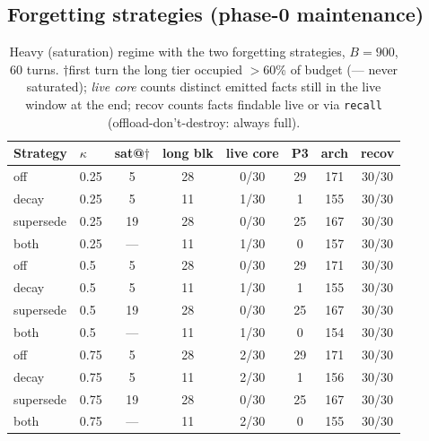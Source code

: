 \documentclass[10pt]{article}
\begin{document}
\subsection{Forgetting strategies (phase-0 maintenance)}\label{sec:forget}
\begin{table}[t]
\centering\small
\begin{tabular}{llcccccc}
\hline
Strategy & $\kappa$ & sat@$\dagger$ & long blk & live core & P3 & arch & recov\\
\hline
off       & 0.25 &  5 & 28 & 0/30 & 29 & 171 & 30/30\\
decay     & 0.25 &  5 & 11 & 1/30 &  1 & 155 & 30/30\\
supersede & 0.25 & 19 & 28 & 0/30 & 25 & 167 & 30/30\\
both      & 0.25 &  --- & 11 & 1/30 &  0 & 157 & 30/30\\
off       &  0.5 &  5 & 28 & 0/30 & 29 & 171 & 30/30\\
decay     &  0.5 &  5 & 11 & 1/30 &  1 & 155 & 30/30\\
supersede &  0.5 & 19 & 28 & 0/30 & 25 & 167 & 30/30\\
both      &  0.5 &  --- & 11 & 1/30 &  0 & 154 & 30/30\\
off       & 0.75 &  5 & 28 & 2/30 & 29 & 171 & 30/30\\
decay     & 0.75 &  5 & 11 & 2/30 &  1 & 156 & 30/30\\
supersede & 0.75 & 19 & 28 & 0/30 & 25 & 167 & 30/30\\
both      & 0.75 &  --- & 11 & 2/30 &  0 & 155 & 30/30\\
\hline
\end{tabular}
\caption{Heavy (saturation) regime with the two forgetting strategies, $B=900$, 60 turns. $\dagger$first turn the long tier occupied $>$60\% of budget (--- never saturated); \emph{live core} counts distinct emitted facts still in the live window at the end; recov counts facts findable live or via \texttt{recall} (offload-don't-destroy: always full).}
\label{tab:forget_heavy}
\end{table}
\end{document}
